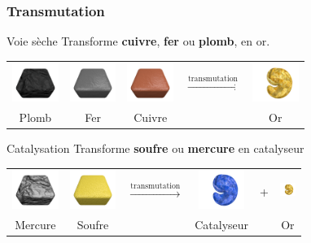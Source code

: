 \documentclass{beamer}
\begin{document}
\begin{frame}
    \frametitle{Transmutation}
    \begin{block}{Voie sèche}
        Transforme \textbf{cuivre}, \textbf{fer} ou \textbf{plomb}, en or.
        \\
        \begin{tabular}{ccccc}
            \includegraphics[width=1.5cm]{../img/material-lead} &
            \includegraphics[width=1.5cm]{../img/material-iron} &
            \includegraphics[width=1.5cm]{../img/material-copper} &
            $\xrightarrow{\text{transmutation}}$ &
            \includegraphics[width=1.5cm]{../img/material-gold}\\
            Plomb & Fer & Cuivre & & Or
        \end{tabular}
    \end{block}
    \begin{block}{Catalysation}
        Transforme \textbf{soufre} ou \textbf{mercure} en catalyseur
        \\
        \begin{tabular}{cccccc}
            \includegraphics[width=1.5cm]{../img/material-mercury} &
            \includegraphics[width=1.5cm]{../img/material-sulfur} &
            $\xrightarrow{\text{transmutation}}$ &
            \includegraphics[width=1.5cm]{../img/material-catalyst} &
            + &
            \includegraphics[width=0.5cm]{../img/material-gold}\\
            Mercure & Soufre & & Catalyseur & & Or\\
        \end{tabular}
    \end{block}
\end{frame}
\end{document}
